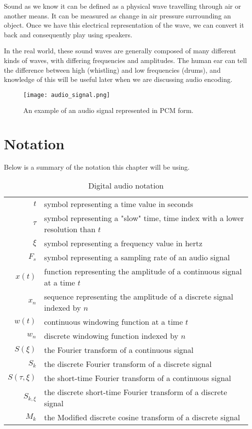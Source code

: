 Sound as we know it can be defined as a physical wave travelling through air or another means. \cite{you_2010} It can be measured as change in air pressure surrounding an object. Once we have this electrical representation of the wave, we can convert it back and consequently play using speakers.

In the real world, these sound waves are generally composed of many different kinds of waves, with differing frequencies and amplitudes. The human ear can tell the difference between high (whistling) and low frequencies (drums), and knowledge of this will be useful later when we are discussing audio encoding.

\begin{figure}[ht]
	\label{fig:audio_signal}
	\caption[Example audio signal]{An example of an audio signal represented in PCM form.}
	\centering
	\texttt{[image: audio\_signal.png]}
\end{figure}

\section{Notation}
Below is a summary of the notation this chapter will be using.

\begin{table}[htbp]\caption{Digital audio notation}
\begin{tabular}{r l}
$t$ & symbol representing a time value in seconds \\
$\tau$ & symbol representing a "slow" time, time index with a lower resolution than $t$ \\
$\xi$ & symbol representing a frequency value in hertz \\
$F_s$ & symbol representing a sampling rate of an audio signal \\
$x(t)$ & function representing the amplitude of a continuous signal at a time $t$ \\
$x_n$ & sequence representing the amplitude of a discrete signal indexed by $n$ \\
$w(t)$ & continuous windowing function at a time $t$ \\
$w_n$ & discrete windowing function indexed by $n$ \\
$S(\xi)$ & the Fourier transform of a continuous signal \\
$S_k$ & the discrete Fourier transform of a discrete signal \\
$S(\tau, \xi)$ & the short-time Fourier transform of a continuous signal \\
$S_{k, \xi}$ & the discrete short-time Fourier transform of a discrete signal \\
$M_k$ & the Modified discrete cosine transform of a discrete signal
\end{tabular}
\end{table}

